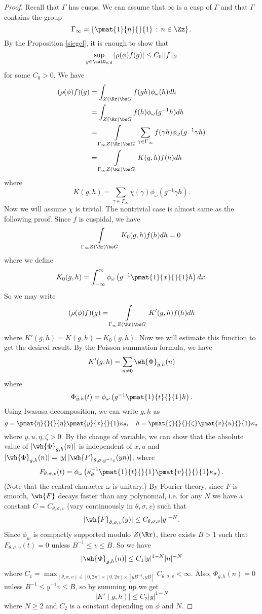 \begin{proof}
Recall that $\Gamma$ has cusps. We can assume that $\infty$ is a cusp of $\Gamma$ and that $\Gamma$ contains the group 
$$
\Gamma_{\infty} = \left\{ \pmat{1}{n}{}{1} \,:\, n\in \Zz\right\}.
$$
By the Proposition \ref{siegel}, it is enough to show that 
$$
\sup_{g\in \calG_{c, d}}|\rho(\phi)f(g)| \leq C_{0}||f||_{2}
$$
for some $C_{0} >0$. We have
\begin{align*}
(\rho(\phi)f)(g) &= \int_{Z(\Rr)\bs G} f(gh)\phi_{\omega}(h) dh \\
&= \int_{Z(\Rr)\bs G} f(h) \phi_{\omega}(g^{-1}h)dh \\
&= \int\limits_{\Gamma_{\infty} Z(\Rr)\bs G} \sum_{\gamma\in \Gamma_{\infty}} f(\gamma h)\phi_{\omega}(g^{-1}\gamma h) \\
&= \int\limits_{\Gamma_{\infty} Z(\Rr)\bs G} K(g, h) f(h) dh
\end{align*}
where 
$$
K(g, h) = \sum_{\gamma\in \Gamma_{\infty}} \chi(\gamma) \phi_{\omega}(g^{-1}\gamma h). 
$$
Now we will assume $\chi$ is trivial. The nontrivial case is almost same as the following proof.
Since $f$ is cuspidal, we have 
$$
\int\limits_{\Gamma_{\infty} Z(\Rr)\bs G} K_{0}(g, h) f(h) dh = 0
$$
where we define
$$
K_{0}(g, h) = \int_{-\infty}^{\infty} \phi_{\omega} \left( g^{-1} \pmat{1}{x}{}{1} h\right) dx.
$$
So we may write 
$$
(\rho(\phi)f)(g) = \int\limits_{\Gamma_{\infty} Z(\Rr)\bs G} K'(g, h) f(h) dh
$$
where $K'(g, h) = K(g, h) - K_{0}(g, h)$. Now we will estimate this function to get the desired result. 
By the Poisson summation formula, we have
$$
K'(g, h) = \sum_{n\neq 0} \wh{\Phi}_{g, h}(n)
$$
where 
$$
\Phi_{g, h}(t) = \phi_{\omega} \left( g^{-1} \pmat{1}{t}{}{1} h\right). 
$$
Using Iwasasa decomposition, we can write $g, h$ as 
$$
g = \pmat{\eta}{}{}{\eta}\pmat{y}{x}{}{1} \kappa_{\theta}, \quad h = \pmat{\zeta}{}{}{\zeta}\pmat{v}{u}{}{1} \kappa_{\sigma}
$$
where $y, u, \eta, \zeta > 0$. By the change of variable, we can show that the absolute value of $|\wh{\Phi}_{g, h}(n)|$ is  independent of $x, u$ and $|\wh{\Phi}_{g, h} (n)| = |y|\,|\wh{F}_{\theta, \sigma, y^{-1}v}(yn)|$, where 
$$
F_{\theta, \sigma, v}(t) = \phi_{\omega} \left( \kappa_{\theta}^{-1} \pmat{1}{t}{}{1} \pmat{v}{}{}{1} \kappa_{\sigma}\right). 
$$
(Note that the central character $\omega$ is unitary.)
By Fourier theory, since $F$ is smooth, $\wh{F}$ decays faster than any polynomial, i.e. for any $N$ we have a constant $C = C_{\theta, \sigma, v}$ (vary continuously in $\theta, \sigma, v$) such that 
$$
|\wh{F}_{\theta, \sigma, v}(y)| \leq C_{\theta, \sigma, v}|y|^{-N}.
$$
Since $\phi_{w}$ is compactly supported modulo $Z(\Rr)$, there exists $B>1$ such that $F_{\theta, \sigma, v}(t) = 0$ unless $B^{-1} \leq v \leq B$.  So we have 
$$
|\wh{\Phi}_{g, h}(n)| \leq C_{1} |y|^{1-N}|n|^{-N}
$$
where $C_{1} = \max_{(\theta, \sigma, v)\in [0, 2\pi]\times [0, 2\pi] \times [yB^{-1}, yB]} C_{\theta, \sigma, v} < \infty$. 
Also, $\Phi_{g, h}(n) = 0$ unless $B^{-1} \leq y^{-1}v \leq B$, so by summing up we get
$$
|K'(g, h)| \leq C_{2} |y|^{1-N}
$$
where $N\geq 2$ and $C_{2}$ is a constant depending on $\phi$ and $N$. 


\end{proof}
